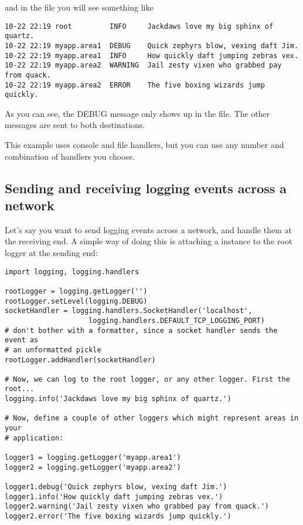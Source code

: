 and in the file you will see something like

\begin{verbatim}
10-22 22:19 root         INFO     Jackdaws love my big sphinx of quartz.
10-22 22:19 myapp.area1  DEBUG    Quick zephyrs blow, vexing daft Jim.
10-22 22:19 myapp.area1  INFO     How quickly daft jumping zebras vex.
10-22 22:19 myapp.area2  WARNING  Jail zesty vixen who grabbed pay from quack.
10-22 22:19 myapp.area2  ERROR    The five boxing wizards jump quickly.
\end{verbatim}

As you can see, the DEBUG message only shows up in the file. The other
messages are sent to both destinations.

This example uses console and file handlers, but you can use any number and
combination of handlers you choose.

\subsection{Sending and receiving logging events across a network
\label{network-logging}}

Let's say you want to send logging events across a network, and handle them
at the receiving end. A simple way of doing this is attaching a
 instance to the root logger at the sending end:

\begin{verbatim}
import logging, logging.handlers

rootLogger = logging.getLogger('')
rootLogger.setLevel(logging.DEBUG)
socketHandler = logging.handlers.SocketHandler('localhost',
                    logging.handlers.DEFAULT_TCP_LOGGING_PORT)
# don't bother with a formatter, since a socket handler sends the event as
# an unformatted pickle
rootLogger.addHandler(socketHandler)

# Now, we can log to the root logger, or any other logger. First the root...
logging.info('Jackdaws love my big sphinx of quartz.')

# Now, define a couple of other loggers which might represent areas in your
# application:

logger1 = logging.getLogger('myapp.area1')
logger2 = logging.getLogger('myapp.area2')

logger1.debug('Quick zephyrs blow, vexing daft Jim.')
logger1.info('How quickly daft jumping zebras vex.')
logger2.warning('Jail zesty vixen who grabbed pay from quack.')
logger2.error('The five boxing wizards jump quickly.')
\end{verbatim}


